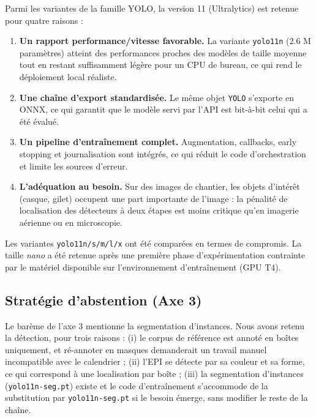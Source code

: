 \documentclass[11pt,a4paper]{article}
\begin{document}
Parmi les variantes de la famille YOLO, la version 11 (Ultralytics) est
retenue pour quatre raisons :

\begin{enumerate}[leftmargin=1.4em]
  \item \textbf{Un rapport performance/vitesse favorable.} La variante
        \texttt{yolo11n} (2.6 M paramètres) atteint des performances
        proches des modèles de taille moyenne tout en restant
        suffisamment légère pour un CPU de bureau, ce qui rend le
        déploiement local réaliste.
  \item \textbf{Une chaîne d'export standardisée.} Le même objet
        \texttt{YOLO} s'exporte en ONNX, ce qui garantit que le modèle
        servi par l'API est bit-à-bit celui qui a été évalué.
  \item \textbf{Un pipeline d'entraînement complet.} Augmentation,
        callbacks, early stopping et journalisation sont intégrés, ce qui
        réduit le code d'orchestration et limite les sources d'erreur.
  \item \textbf{L'adéquation au besoin.} Sur des images de chantier, les
        objets d'intérêt (casque, gilet) occupent une part importante de
        l'image : la pénalité de localisation des détecteurs à deux étapes
        est moins critique qu'en imagerie aérienne ou en microscopie.
\end{enumerate}

Les variantes \texttt{yolo11n/s/m/l/x} ont été comparées en termes de
compromis. La taille \emph{nano} a été retenue après une première phase
d'expérimentation contrainte par le matériel disponible sur l'environnement
d'entraînement (GPU T4).

\subsection{Stratégie d'abstention (Axe 3)}
\label{sec:archi}

Le barème de l'axe 3 mentionne la segmentation d'instances. Nous avons
retenu la détection, pour trois raisons : (i) le corpus de référence est
annoté en boîtes uniquement, et ré-annoter en masques demanderait un travail
manuel incompatible avec le calendrier ; (ii) l'EPI se détecte par sa
couleur et sa forme, ce qui correspond à une localisation par boîte ; (iii)
la segmentation d'instances (\texttt{yolo11n-seg.pt}) existe et le code d'entraînement
s'accommode de la substitution par \texttt{yolo11n-seg.pt} si le besoin
émerge, sans modifier le reste de la chaîne.
\end{document}
